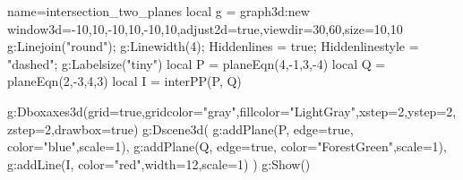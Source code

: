 \documentclass[12pt]{standalone}
\begin{document}
\begin{luadraw}{name=intersection_two_planes}
local g = graph3d:new{ window3d={-10,10,-10,10,-10,10},adjust2d=true,viewdir={30,60},size={10,10}}
g:Linejoin("round"); g:Linewidth(4); Hiddenlines = true; Hiddenlinestyle = "dashed"; g:Labelsize("tiny")
local P = planeEqn(4,-1,3,-4)
local Q = planeEqn(2,-3,4,3) 
local I = interPP(P, Q) 

g:Dboxaxes3d({grid=true,gridcolor="gray",fillcolor="LightGray",xstep=2,ystep=2,zstep=2,drawbox=true})
g:Dscene3d(
    g:addPlane(P, {edge=true, color="blue",scale=1}),
    g:addPlane(Q, {edge=true, color="ForestGreen",scale=1}), 
    g:addLine(I, {color="red",width=12,scale=1})
    )
g:Show()
\end{luadraw} 
\end{document}
